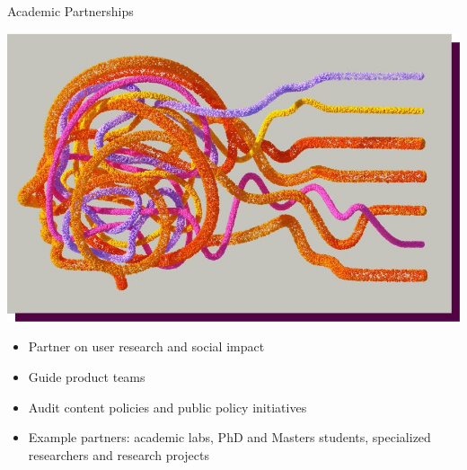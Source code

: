 \documentclass[nobackground,dvipsnames,table]{beamer}
\begin{document}
\begin{frame}{Academic Partnerships}

\begin{center}
    \includegraphics[width=.7\textwidth]{img/fig15.jpg}
\end{center}

\small{
    \begin{itemize} 
        \item Partner on user research and social impact 
        \item Guide product teams
        \item Audit content policies and public policy initiatives
        \item Example partners: academic labs, PhD and Masters students, specialized researchers and research projects
    \end{itemize}
}
\end{frame}
\end{document}
